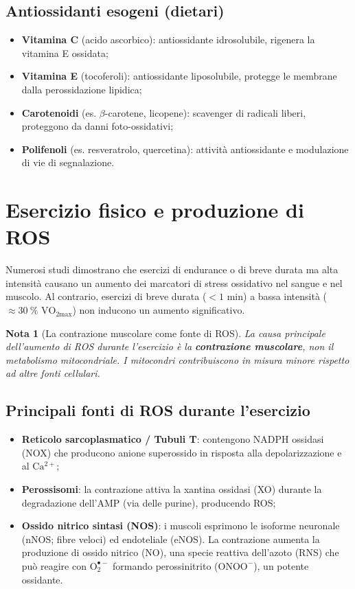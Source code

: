 \documentclass[12pt,a4paper]{report}
\newtheorem{nota}{Nota}[section]
\begin{document}
\subsection{Antiossidanti esogeni (dietari)}
\begin{itemize}
\item \textbf{Vitamina C} (acido ascorbico): antiossidante idrosolubile, rigenera la vitamina E ossidata;
\item \textbf{Vitamina E} (tocoferoli): antiossidante liposolubile, protegge le membrane dalla perossidazione lipidica;
\item \textbf{Carotenoidi} (es. \(\beta\)-carotene, licopene): scavenger di radicali liberi, proteggono da danni foto-ossidativi;
\item \textbf{Polifenoli} (es. resveratrolo, quercetina): attività antiossidante e modulazione di vie di segnalazione.
\end{itemize}

\section{Esercizio fisico e produzione di ROS}
Numerosi studi dimostrano che esercizi di endurance o di breve durata ma alta intensità causano un aumento dei marcatori di stress ossidativo nel sangue e nel muscolo. Al contrario, esercizi di breve durata (\(<1\) min) a bassa intensità (\(\approx \SI{30}{\percent}\) \(\mathrm{VO_{2max}}\)) non inducono un aumento significativo.

\begin{nota}[La contrazione muscolare come fonte di ROS]
La causa principale dell'aumento di ROS durante l'esercizio è la \textbf{contrazione muscolare}, non il metabolismo mitocondriale. I mitocondri contribuiscono in misura minore rispetto ad altre fonti cellulari.
\end{nota}

\subsection{Principali fonti di ROS durante l'esercizio}
\begin{itemize}
\item \textbf{Reticolo sarcoplasmatico / Tubuli T}: contengono NADPH ossidasi (NOX) che producono anione superossido in risposta alla depolarizzazione e al \(\mathrm{Ca^{2+}}\);
\item \textbf{Perossisomi}: la contrazione attiva la xantina ossidasi (XO) durante la degradazione dell'AMP (via delle purine), producendo ROS;
\item \textbf{Ossido nitrico sintasi (NOS)}: i muscoli esprimono le isoforme neuronale (nNOS; fibre veloci) ed endoteliale (eNOS). La contrazione aumenta la produzione di ossido nitrico (\(\mathrm{NO}\)), una specie reattiva dell'azoto (RNS) che può reagire con \(\mathrm{O_2^{\bullet-}}\) formando perossinitrito (\(\mathrm{ONOO^-}\)), un potente ossidante.
\end{itemize}
\end{document}
